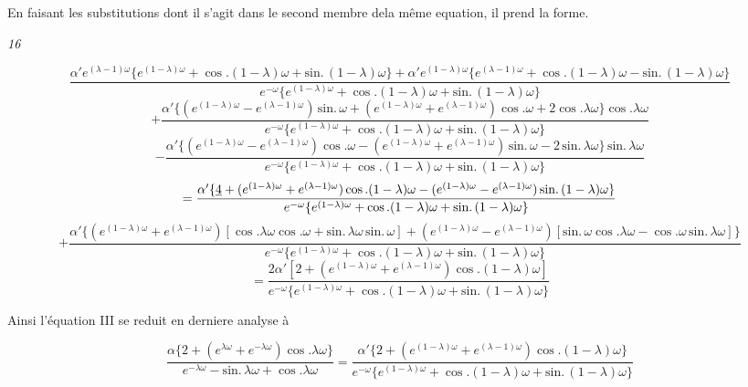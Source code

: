 \documentclass[11pt,a4paper]{article}
\begin{document}
En faisant les substitutions dont il s'agit dans le second membre dela même
equation, il prend la forme.

\emph{16}

\[ \frac{\alpha' e^{(\lambda-1)\omega}\{e^{(1-\lambda)\omega}+\cos.(1-\lambda)\omega+\text{sin.}\,(1-\lambda)\omega\}+\alpha' e^{(1-\lambda)\omega}\{e^{(\lambda-1)\omega}+\cos.(1-\lambda)\omega-\text{sin.}\,(1-\lambda)\omega\}}{e^{-\omega}\{e^{(1-\lambda)\omega}+\cos.(1-\lambda)\omega+\text{sin.}\,(1-\lambda)\omega\}} \]
\[ +\frac{\alpha'\{(e^{(1-\lambda)\omega}-e^{(\lambda-1)\omega})\,\text{sin.}\,\omega+(e^{(1-\lambda)\omega}+e^{(\lambda-1)\omega})\cos.\omega+2\cos.\lambda\omega\}\cos.\lambda\omega}{e^{-\omega}\{e^{(1-\lambda)\omega}+\cos.(1-\lambda)\omega+\text{sin.}\,(1-\lambda)\omega\}} \]
\[ -\frac{\alpha'\{(e^{(1-\lambda)\omega}-e^{(\lambda-1)\omega})\cos.\omega-(e^{(1-\lambda)\omega}+e^{(\lambda-1)\omega})\,\text{sin.}\,\omega-2\,\text{sin.}\,\lambda\omega\}\,\text{sin.}\,\lambda\omega}{e^{-\omega}\{e^{(1-\lambda)\omega}+\cos.(1-\lambda)\omega+\text{sin.}\,(1-\lambda)\omega\}} \]
\[ =\frac{\alpha'\{\uncertain{4}+(e^{(1-\lambda)\omega}+e^{(\lambda-1)\omega})\cos.(1-\lambda)\omega-(e^{(1-\lambda)\omega}-e^{(\lambda-1)\omega})\,\text{sin.}\,(1-\lambda)\omega\}}{e^{-\omega}\{e^{(1-\lambda)\omega}+\cos.(1-\lambda)\omega+\text{sin.}\,(1-\lambda)\omega\}} \]
\[ +\frac{\alpha'\{(e^{(1-\lambda)\omega}+e^{(\lambda-1)\omega})[\cos.\lambda\omega\cos.\omega+\text{sin.}\,\lambda\omega\,\text{sin.}\,\omega]+(e^{(1-\lambda)\omega}-e^{(\lambda-1)\omega})[\text{sin.}\,\omega\cos.\lambda\omega-\cos.\omega\,\text{sin.}\,\lambda\omega]\}}{e^{-\omega}\{e^{(1-\lambda)\omega}+\cos.(1-\lambda)\omega+\text{sin.}\,(1-\lambda)\omega\}} \]
\[ =\frac{2\alpha'[2+(e^{(1-\lambda)\omega}+e^{(\lambda-1)\omega})\cos.(1-\lambda)\omega]}{e^{-\omega}\{e^{(1-\lambda)\omega}+\cos.(1-\lambda)\omega+\text{sin.}\,(1-\lambda)\omega\}} \]

Ainsi l'équation III se reduit en derniere analyse à

\[ \frac{\alpha\{2+(e^{\lambda\omega}+e^{-\lambda\omega})\cos.\lambda\omega\}}{e^{-\lambda\omega}-\text{sin.}\,\lambda\omega+\cos.\lambda\omega}=\frac{\alpha'\{2+(e^{(1-\lambda)\omega}+e^{(\lambda-1)\omega})\cos.(1-\lambda)\omega\}}{e^{-\omega}\{e^{(1-\lambda)\omega}+\cos.(1-\lambda)\omega+\text{sin.}\,(1-\lambda)\omega\}} \]
\end{document}
